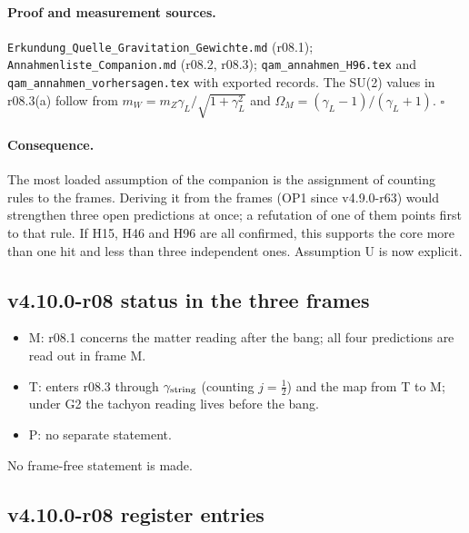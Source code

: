 \paragraph{Proof and measurement sources.}
\texttt{Erkundung\_\allowbreak Quelle\_\allowbreak Gravitation\_\allowbreak Gewichte.md} (r08.1); \texttt{Annahmenliste\_\allowbreak Companion.md} (r08.2, r08.3);
\texttt{qam\_\allowbreak annahmen\_\allowbreak H96.tex} and \texttt{qam\_\allowbreak annahmen\_\allowbreak vorhersagen.tex} with exported records.  The SU(2) values in r08.3(a)
follow from \(m_W=m_Z\gamma_L/\sqrt{1+\gamma_L^2}\) and \(\Omega_M=(\gamma_L-1)/(\gamma_L+1)\).  \(\square\)

\paragraph{Consequence.}
The most loaded assumption of the companion is the assignment of counting rules to the frames.  Deriving it from the frames (OP1 since v4.9.0-r63)
would strengthen three open predictions at once; a refutation of one of them points first to that rule.  If H15, H46 and H96 are all confirmed, this
supports the core more than one hit and less than three independent ones.  Assumption U is now explicit.

\subsection*{v4.10.0-r08 status in the three frames}
\label{subsec:v4100-r08-frames}

\begin{itemize}[leftmargin=2em]
\item M: r08.1 concerns the matter reading after the bang; all four predictions are read out in frame M.
\item T: enters r08.3 through \(\gamma_{\rm string}\) (counting \(j=\tfrac12\)) and the map from T to M; under G2 the tachyon reading lives before the bang.
\item P: no separate statement.
\end{itemize}
No frame-free statement is made.

\subsection*{v4.10.0-r08 register entries}
\label{subsec:v4100-r08-register}

